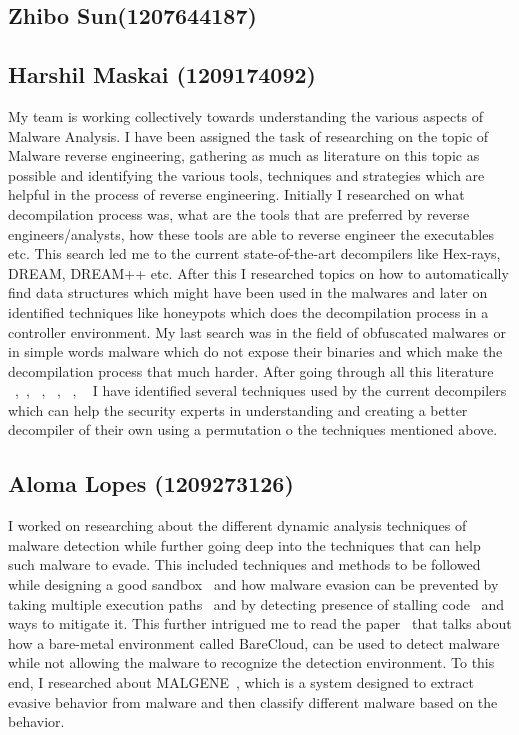 \documentclass[11pt]{article}
\begin{document}
\subsection{Zhibo Sun(1207644187)}

\subsection{Harshil Maskai (1209174092)}
My team is working collectively towards understanding the various aspects of Malware Analysis. I have been assigned the task of researching on the topic of Malware reverse engineering, gathering as much as literature on this topic as possible and identifying the various tools, techniques and strategies which are helpful in the process of reverse engineering. Initially I researched on what decompilation process was, what are the tools that are preferred by reverse engineers/analysts, how these tools are able to reverse engineer the executables etc. This search led me to the current state-of-the-art decompilers like Hex-rays, DREAM, DREAM++ etc. After this I researched topics on how to automatically find data structures which might have been used in the malwares and later on identified techniques like honeypots which does the decompilation process in a controller environment. My last search was in the field of obfuscated malwares or in simple words malware which do not expose their binaries and which make the decompilation process that much harder.
After going through all this literature ~\cite{yakdan2016helping},~\cite{guilfanov2008decompilers}, ~\cite{yakdan2015no}, ~\cite{lin2010automatic}, ~\cite{honeypot2016}, ~\cite{rotalumegatech} I have identified several techniques used by the current decompilers which can help the security experts in understanding and creating a better decompiler of their own using a permutation o the techniques mentioned above.


\subsection{Aloma Lopes (1209273126)}
I worked on researching about the different dynamic analysis techniques of malware detection while further going deep into the techniques that can help such malware to evade. This included techniques and methods to be followed while designing a good sandbox~\cite{kruegel2014full} and how malware evasion can be prevented by taking multiple execution paths~\cite{moser2007exploring} and by detecting presence of stalling code~\cite{kolbitsch2011power} and ways to mitigate it. This further intrigued me to read the paper~\cite{kirat2014barecloud} that talks about how a bare-metal environment called BareCloud, can be used to detect malware while not allowing the malware to recognize the detection environment. To this end, I researched about MALGENE~\cite{kirat2015malgene}, which is a system designed to extract evasive behavior from malware and then classify different malware based on the behavior.
\end{document}
